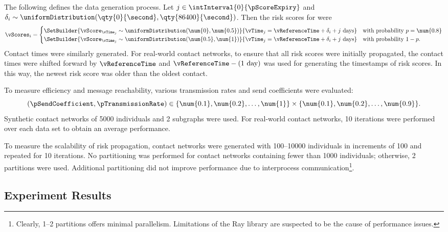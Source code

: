 The following defines the data generation process. Let $j \in \intInterval{0}{\pScoreExpiry}$ and $\delta_i \sim \uniformDistribution(\qty{0}{\second}, \qty{86400}{\second})$. Then the risk scores for  were
\begin{equation*}
  \vScores_i = 
    \begin{cases}
      \SetBuilder{\vScore_{\vTime_j} \sim \uniformDistribution(\num{0}, \num{0.5})}{ \vTime_j = \vReferenceTime + \delta_i + j \text{ days}} & \text{with probability } p = \num{0.8} \\
      \SetBuilder{\vScore_{\vTime_j} \sim \uniformDistribution(\num{0.5}, \num{1})}{\vTime_j = \vReferenceTime + \delta_i + j \text{ days}} & \text{with probability } 1 - p.
    \end{cases}
\end{equation*}
Contact times were similarly generated. For real-world contact networks, to ensure that all risk scores were initially propagated, the contact times were shifted forward by $\vReferenceTime$ and $\vReferenceTime - (1 \text{ day})$ was used for generating the timestamps of risk scores. In this way, the newest risk score was older than the oldest contact.

To measure efficiency and message reachability, various transmission rates and send coefficients were evaluated:
\begin{equation*}
  (\pSendCoefficient, \pTransmissionRate) \in \{\num{0.1}, \num{0.2}, \ldots, \num{1}\} \times \{\num{0.1}, \num{0.2}, \ldots, \num{0.9}\}.
\end{equation*}
Synthetic contact networks of \num{5000} individuals and \num{2} subgraphs were used. For real-world contact networks, \num{10} iterations were performed over each data set to obtain an average performance.

To measure the scalability of risk propagation, contact networks were generated with \numrange{100}{10000} individuals in increments of \num{100} and repeated for \num{10} iterations. No partitioning was performed for contact networks containing fewer than \num{1000} individuals; otherwise, \num{2} partitions were used. Additional partitioning did not improve performance due to interprocess communication\footnote{Clearly, \numrange{1}{2} partitions offers minimal parallelism. Limitations of the Ray library are suspected to be the cause of performance issues.}.

\subsection{Experiment Results}

